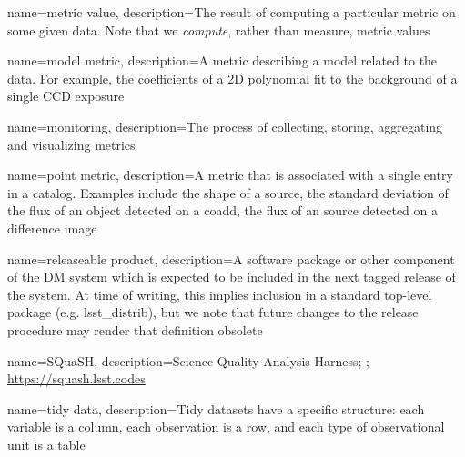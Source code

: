 {
  name={metric value},
  description={The result of computing a particular \gls{metric} on some given
  data. Note that we \textit{compute}, rather than measure, metric values}
}

{
  name={model metric},
  description={A \gls{metric} describing a model related to the data. For
  example, the coefficients of a 2D polynomial fit to the background of a
  single CCD exposure}
}

{
  name={monitoring},
  description={The process of collecting, storing, aggregating and visualizing
  metrics}
}

{
  name={point metric},
  description={A \gls{metric} that is associated with a single entry in a
  catalog. Examples include the shape of a source, the standard deviation of
  the flux of an object detected on a coadd, the flux of an source detected on
  a difference image}
}

{
  name={releaseable product},
  description={A software package or other component of the DM system which
  is expected to be included in the next tagged release of the system. At time
  of writing, this implies inclusion in a standard top-level package
  (e.g. lsst\_distrib), but we note that future changes to the release procedure
  may render that definition obsolete}
}

{
  name={SQuaSH},
  description={Science Quality Analysis Harness; ;
  \url{https://squash.lsst.codes}}
}

{
  name={tidy data},
  description={Tidy datasets have a specific structure: each variable is a
  column, each observation is a row, and each type of observational unit is a
  table \citep{JSSv059i10}}
}
